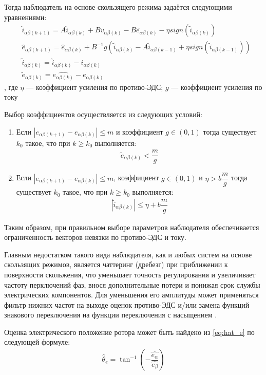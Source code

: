 Тогда наблюдатель на основе скользящего режима задаётся следующими уравнениями:
\begin{align}
	&\hat{i}_{\alpha\beta(k+1)}=A\hat{i}_{\alpha\beta(k)}+Bv_{\alpha\beta(k)}-B\hat{e}_{\alpha\beta(k)}-\eta sign(\tilde{i}_{\alpha\beta(k)})\\
	\label{eq:hat_e}
	&\hat{e}_{\alpha\beta(k+1)}=\hat{e}_{\alpha\beta(k)}+B^{-1}g(\tilde{i}_{\alpha\beta(k)}-A\tilde{i}_{\alpha\beta(k-1)}+\eta sign(\tilde{i}_{\alpha\beta(k-1)}))\\
	&\tilde{i}_{\alpha\beta(k)}=\hat{i}_{\alpha\beta(k)}-i_{\alpha\beta(k)}\\
	&\tilde{e}_{\alpha\beta(k)}=\hat{e_{\alpha\beta(k)}}-e_{\alpha\beta(k)}
\end{align}, где $\eta$ --- коэффициент усиления по противо-ЭДС; $g$ --- коэффициент усиления по току

Выбор коэффициентов осуществляется из следующих условий:
\begin{enumerate}
	\item Если $|e_{\alpha\beta(k+1)}-e_{\alpha\beta(k)}|\leq m$ и коэффициент $g\in (0, 1)$ тогда существует $k_0$ такое, что при $k\geq k_0$ выполняется:
	\begin{align*}
		\tilde{e}_{\alpha\beta(k)}<\dfrac{m}{g}
	\end{align*}
	\item Если $|e_{\alpha\beta(k+1)}-e_{\alpha\beta(k)}|\leq m$, коэффициент $g\in (0, 1)$ и $\eta>b\dfrac{m}{g}$ тогда существует $k_0$ такое, что при $k\geq k_0$ выполняется:
	\begin{align*}
		|\tilde{i}_{\alpha\beta(k)}|\leq \eta +b\dfrac{m}{g}
	\end{align*}
\end{enumerate}

Таким образом, при правильном выборе параметров наблюдателя обеспечивается ограниченность векторов невязки по противо-ЭДС и току.

Главным недостатком такого вида наблюдателя, как и любых систем на основе скользящих режимов, является чаттеринг (дребезг) при приближении к поверхности скольжения, что уменьшает точность регулирования и увеличивает частоту перключений фаз, внося дополнительные потери и понижая срок службы электрических компонентов. Для уменьшения его амплитуды может применяться фильтр нижних частот на выходе оценок противо-ЭДС \cite{art:smo} и/или замена функций знакового переключения на функции переключения с насыщением \cite{art:dtc_smo}.

Оценка электрического положение ротора может быть найдено из \ref{eq:hat_e} по следующей формуле:
\begin{align*}
	\hat{\theta}_e = \tan^{-1}\left(-\dfrac{\hat{e_\alpha}}{\hat{e_\beta}}\right)
\end{align*}

